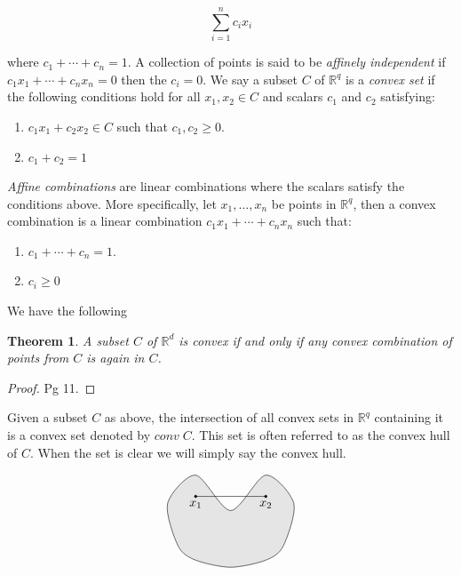 \documentclass[oneside,12pt]{amsart}
\newtheorem{Theorem}{Theorem}[section]
\theoremstyle{definition}
\numberwithin{equation}{section}
\begin{document}
$$\sum_{i=1}^n c_ix_i$$

where $c_1 + \cdots + c_n = 1$.  A collection of points is said to be \textit{affinely independent} if $c_1x_1 + \cdots +c_nx_n = 0$ then the $c_i = 0$.  We say a subset $C$ of $\mathbb{R}^q$ is a \textit{convex set} if the following conditions hold for all $x_1, x_2 \in C$ and scalars $c_1$ and $c_2$ satisfying:

\begin{center}
\begin{enumerate}
  \item $c_1x_1 + c_2x_2 \in C$ such that $c_1, c_2 \geq 0$.\\
  \item $c_1 + c_2 = 1$
\end{enumerate}
\end{center}


\textit{Affine combinations} are linear combinations where the scalars satisfy the conditions above.  More specifically, let $x_1,\ldots,x_n$ be points in $\mathbb{R}^q$, then a convex combination is a linear combination $c_1x_1+ \cdots + c_nx_n$ such that:

\begin{center}
\begin{enumerate}
  \item $c_1 + \cdots + c_n =1$. \\
  \item $c_i \geq 0$
\end{enumerate}
\end{center}

We have the following

\begin{Theorem}
A subset $C$ of $\mathbb{R}^d$ is convex if and only if any convex combination of points from $C$ is again in $C$.
\end{Theorem}
\begin{proof}
\cite{B} Pg 11.
\end{proof}

Given a subset $C$ as above, the intersection of all convex sets in $\mathbb{R}^q$ containing it is a convex set denoted by $conv \;C$.  This set is often referred to as the convex hull of $C$. When the set is clear we will simply say the convex hull.

\begin{minipage}{\linewidth}
$$\begin{tikzpicture}
\filldraw [color=gray!20] plot [smooth cycle] coordinates {(-1,2)(-1.8,1.2) (-1.5,0) (-1,-.4) (0,-.6) (1,-.4)(1.5,0)(1.8,1.2)(1,2)(0,1)};
\draw  plot [smooth cycle] coordinates {(-1,2)(-1.8,1.2) (-1.5,0) (-1,-.4) (0,-.6) (1,-.4)(1.5,0)(1.8,1.2)(1,2)(0,1)};
\draw (-1,1.4)--(1,1.4);
\filldraw[black] (-1,1.4) node[below=.1pt]{$x_1$} circle (1pt);
\filldraw[black] (1,1.4) node[below=.1pt]{$x_2$} circle (1pt);
\end{tikzpicture}$$
        \end{minipage}\\
\end{document}
